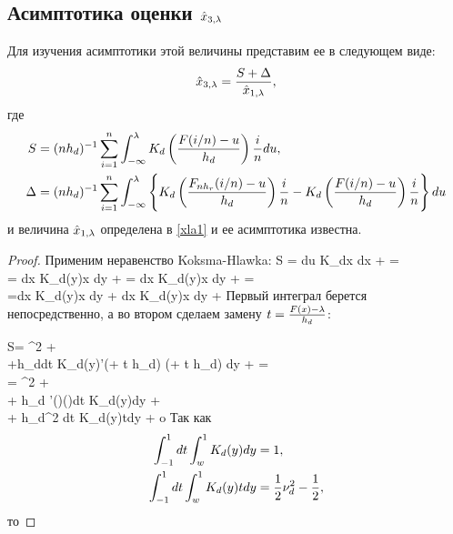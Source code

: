 \documentclass[a4paper,14pt,russian]{article}
\begin{document}
\newpage


\subsection{Асимптотика оценки $\hat{x}_{3,\lambda}$}
Для изучения асимптотики этой величины представим ее в следующем виде:
$$
\hat{x}_{3,\lambda} = \frac{S + \Delta}{\hat{x}_{1,\lambda}},
$$
где
\begin{align}
S & =  (n h_d)^{-1} \sum_{i=1}^{n} \int_{-\infty}^{\lambda} K_d\left(\frac{F(i/n)-u}{h_d}\right)\frac{i}{n}du,
\label{xla3S1} \\
\Delta & =  (n h_d)^{-1} \sum_{i=1}^{n} \int_{-\infty}^{\lambda}\left\{K_d\left(\frac{F_{n h_r}(i/n)-u}{h_d}\right)\frac{i}{n}- K_d\left(\frac{F(i/n)-u}{h_d}\right)\frac{i}{n}\right\}du
\label{xla3Delta}
\end{align}
и величина $\hat{x}_{1,\lambda}$ определена в \eqref{xla1} и ее асимптотика известна.

\begin{lemma}
\end{lemma}
\begin{proof}
Применим неравенство Koksma-Hlawka:
\ml
{
S =  \I{-\infty}{\la}du  K_dx dx +  = \\ = dx  K_d(y)x dy +  =
dx  K_d(y)x dy +  =\\ =dx  K_d(y)x dy + dx  K_d(y)x dy + 
 }
 Первый интеграл берется непосредственно, а во втором сделаем замену $t = \frac{F(x)-\lambda}{h_d}$:

 \ml
 {S= ^2 + \\ +h_ddt  K_d(y)\F'(\la + t h_d) \Fb(\la + t h_d) dy +  =\\ =  ^2 +\\+ h_d \F'(\la)\Fb(\la)dt K_d(y)dy +\\+ h_d^2 dt K_d(y)tdy  + o
 }
 Так как
 \begin{align*}
 \int_{-1}^{1}dt \int_{w}^{1}K_d(y)dy&=1,\\
  \int_{-1}^{1}dt \int_{w}^{1}K_d(y)tdy&=\frac12\nu_d^2-\frac12 ,
  \end{align*}
 то
\end{proof}
\end{document}
